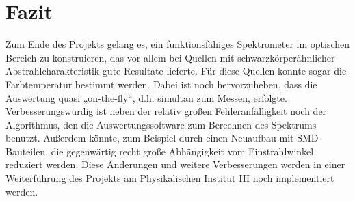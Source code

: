 \documentclass[11pt]{scrartcl}
\begin{document}
\section{Fazit}
Zum Ende des Projekts gelang es, ein funktionsfähiges Spektrometer im optischen Bereich zu konstruieren, das vor allem bei Quellen mit schwarzkörperähnlicher Abstrahlcharakteristik gute Resultate lieferte. Für diese Quellen konnte sogar die Farbtemperatur bestimmt werden. Dabei ist noch hervorzuheben, dass die Auswertung quasi „on-the-fly“, d.h. simultan zum Messen, erfolgte.
Verbesserungswürdig ist neben der relativ großen Fehleranfälligkeit noch der Algorithmus, den die Auswertungssoftware zum Berechnen des Spektrums benutzt. Außerdem könnte, zum Beispiel durch einen Neuaufbau mit SMD-Bauteilen, die gegenwärtig recht große Abhängigkeit vom Einstrahlwinkel reduziert werden. Diese Änderungen und weitere Verbesserungen werden in einer Weiterführung des Projekts am Physikalischen Institut III noch implementiert werden.
\end{document}
